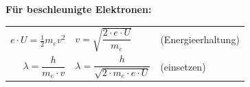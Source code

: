 \documentclass[11pt,a4paper,landscape]{article}
\begin{document}
\begin{minipage}[t]{0.48\textwidth}
\vspace{0.3em}
\begin{center}
\end{center}

\vspace{0.5em}

\textbf{Für beschleunigte Elektronen:}

\vspace{0.2em}
\begin{tabular}{@{}r@{\;$\Rightarrow$\;}l@{\quad}l@{}}
$e \cdot U = \frac{1}{2} m_e v^2$ & $v = \sqrt{\dfrac{2 \cdot e \cdot U}{m_e}}$ & {\small(Energieerhaltung)} \\[0.8em]
$\lambda = \dfrac{h}{m_e \cdot v}$ & $\lambda = \dfrac{h}{\sqrt{2 \cdot m_e \cdot e \cdot U}}$ & {\small(einsetzen)}
\end{tabular}

\end{minipage}
\hfill
\end{document}
